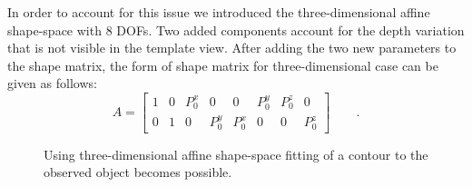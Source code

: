In order to account for this issue we introduced the three-dimensional affine
shape-space with 8 DOFs.
Two added components
account for the depth variation that is not visible in the template
view. After adding the two new parameters to the shape matrix, the form
of shape matrix for three-dimensional case can be given as follows:
\begin{equation}
  \label{eq:4.18}
  A =
  \begin{bmatrix}
    1 & 0 & P_0^x & 0 & 0 & P_0^y & P_0^z & 0\\
    0 & 1 & 0 & P_0^y & P_0^x & 0 & 0  & P_0^z
  \end{bmatrix}\qquad.
\end{equation}

\begin{figure}[htbp]
  \begin{minipage}[t]{0.5\linewidth} 
    \centering 
  \end{minipage}%
  \begin{minipage}[t]{0.5\linewidth} 
    \centering 
  \end{minipage} 
  \caption[Fitting the contour of three-dimensional object]{Using three-dimensional
    affine shape-space fitting of a contour to the observed object
    becomes possible.}
\label{fig:box_match}
\end{figure}

